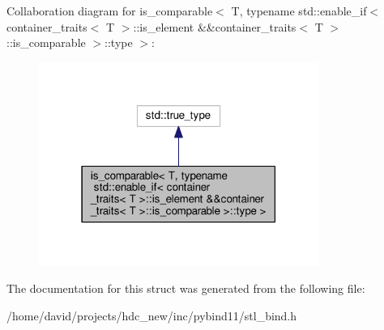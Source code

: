 Collaboration diagram for is\+\_\+comparable$<$ T, typename std\+:\+:enable\+\_\+if$<$ container\+\_\+traits$<$ T $>$\+:\+:is\+\_\+element \&\&container\+\_\+traits$<$ T $>$\+:\+:is\+\_\+comparable $>$\+:\+:type $>$\+:
\nopagebreak
\begin{figure}[H]
\begin{center}
\leavevmode
\includegraphics[width=259pt]{structis__comparable_3_01_t_00_01typename_01std_1_1enable__if_3_01container__traits_3_01_t_01_4_54bf0da386f83ba37ce9348e71c668fb}
\end{center}
\end{figure}


The documentation for this struct was generated from the following file\+:\begin{DoxyCompactItemize}
\item 
/home/david/projects/hdc\+\_\+new/inc/pybind11/stl\+\_\+bind.\+h\end{DoxyCompactItemize}
